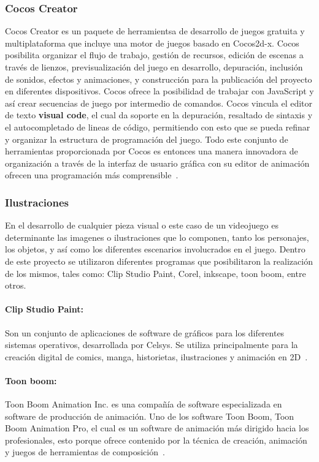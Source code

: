 \documentclass[journal,transmag]{IEEEtran}
\begin{document}
\subsubsection{Cocos Creator}
Cocos Creator es un paquete de herramientsa de desarrollo de juegos gratuita y multiplataforma que incluye una motor de juegos basado en Cocos2d-x. Cocos posibilita organizar el flujo de trabajo, gestión de recursos, edición de escenas a través de lienzos, previsualización del juego en desarrollo, depuración, inclusión de sonidos, efectos y animaciones, y construcción para la publicación del proyecto en diferentes dispositivos. Cocos ofrece la posibilidad de trabajar con JavaScript y así crear secuencias de juego por intermedio de comandos. Cocos vincula el editor de texto \textbf{visual code}, el cual da soporte en la depuración, resaltado de sintaxis y el autocompletado de lineas de código, permitiendo con esto que se pueda refinar y organizar la estructura de programación del juego. Todo este conjunto de herramientas proporcionada por Cocos es entonces una manera innovadora de organización a través de la interfaz de usuario gráfica con su editor de animación ofrecen una programación más comprensible~\cite{Cocos}.

\subsubsection{Ilustraciones}
En el desarrollo de cualquier pieza visual o este caso de un videojuego es determinante las imagenes o ilustraciones que lo componen, tanto los personajes, los objetos, y así como los diferentes escenarios involucrados en el juego. Dentro de este proyecto se utilizaron diferentes programas que posibilitaron la realización de los mismos, tales como: Clip Studio Paint, Corel, inkscape, toon boom, entre otros.

\paragraph{Clip Studio Paint:} Son un conjunto de aplicaciones de software de gráficos para los diferentes sistemas operativos, desarrollada por Celsys. Se utiliza principalmente para la creación digital de comics, manga, historietas, ilustraciones y animación en 2D~\cite{ClipP}.

\paragraph{Toon boom:} Toon Boom Animation Inc. es una compañía de software especializada en software de producción de animación. Uno de los software Toon Boom, Toon Boom Animation Pro, el cual  es un software de animación más dirigido hacia los profesionales, esto porque ofrece contenido por la técnica de creación, animación y juegos de herramientas de composición~\cite{ToonB}. 
\end{document}
